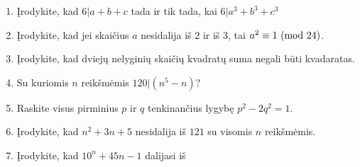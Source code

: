 \begin{enumerate}
  \item Įrodykite, kad $6|a+b+c$ tada ir tik tada, kai $6|a^3+b^3+c^3$
  \item Įrodykite, kad jei skaičius $a$ nesidalija iš $2$ ir iš $3$, tai
    $a^2 \equiv 1 \ (\text{mod } 24)$.
  \item Įrodykite, kad dviejų nelyginių skaičių kvadratų suma negali būti
    kvadaratas.  
  \item Su kuriomis $n$ reikšmėmis $120|(n^5-n)$?  
  \item Raskite visus pirminius $p$ ir $q$ tenkinančius lygybę $p^2 - 2q^2 = 1$.  
  \item Įrodykite, kad $n^2 + 3n + 5$ nesidalija iš $121$ su visomis $n$
    reikšmėmis.  
  \item \text{[LitKo 2002]} Įrodykite, kad $10^n + 45n - 1$ dalijasi iš

\end{enumerate}
